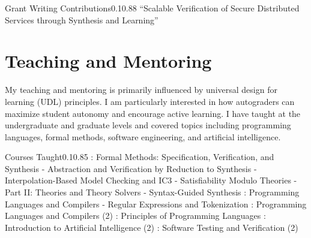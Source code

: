 \documentclass{federico_cv}
\begin{document}
\begin{tblSubSection}{Grant Writing Contributions}{0.1}{0.88}
{``Scalable Verification of Secure Distributed Services through Synthesis and Learning''}
\end{tblSubSection}


\section{Teaching and Mentoring}


My teaching and mentoring is primarily influenced by universal design for
learning (UDL) principles. I am particularly interested in how autograders can
maximize student autonomy and encourage active learning. I have taught at
the undergraduate and graduate levels and covered topics including programming
languages, formal methods, software engineering, and artificial intelligence.


\begin{tblSubSection}{Courses Taught}{0.1}{0.85}
{: Formal Methods: Specification, Verification, and Synthesis}
{\quad - Abstraction and Verification by Reduction to Synthesis} 
{\quad - Interpolation-Based Model Checking and IC3}
{\quad - Satisfiability Modulo Theories - Part II: Theories and Theory Solvers}
{\quad - Syntax-Guided Synthesis} 
{: Programming Languages and Compilers}
{\quad - Regular Expressions and Tokenization}
{: Programming Languages and Compilers (2)}
{: Principles of Programming Languages} 
{: Introduction to Artificial Intelligence (2)}
{: Software Testing and Verification (2)}
\end{tblSubSection}
\end{document}
